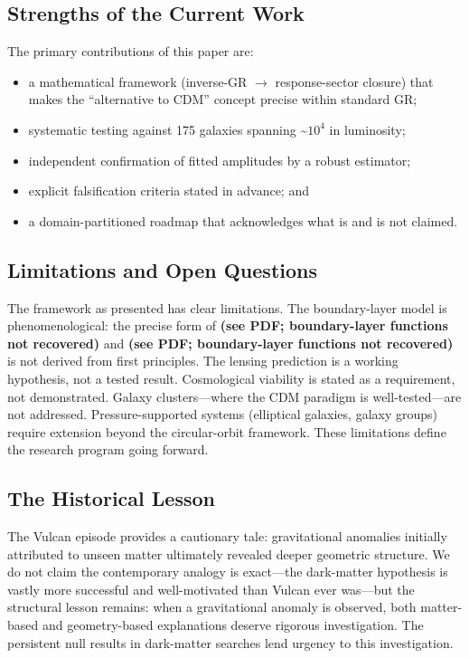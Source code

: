 \subsection{Strengths of the Current Work}

The primary contributions of this paper are:
\begin{itemize}
	\item a mathematical framework (inverse-GR $\to$ response-sector closure) that makes the ``alternative to CDM'' concept precise within standard GR;
	\item systematic testing against 175 galaxies spanning \textasciitilde{}$10^4$ in luminosity;
	\item independent confirmation of fitted amplitudes by a robust estimator;
	\item explicit falsification criteria stated in advance; and
	\item a domain-partitioned roadmap that acknowledges what is and is not claimed.
\end{itemize}

\subsection{Limitations and Open Questions}

The framework as presented has clear limitations. The boundary-layer model is phenomenological: the precise form of \textbf{(see PDF; boundary-layer functions not recovered)} and \textbf{(see PDF; boundary-layer functions not recovered)} is not derived from first principles. The lensing prediction is a working hypothesis, not a tested result. Cosmological viability is stated as a requirement, not demonstrated. Galaxy clusters---where the CDM paradigm is well-tested---are not addressed. Pressure-supported systems (elliptical galaxies, galaxy groups) require extension beyond the circular-orbit framework. These limitations define the research program going forward.

\subsection{The Historical Lesson}

The Vulcan episode provides a cautionary tale: gravitational anomalies initially attributed to unseen matter ultimately revealed deeper geometric structure. We do not claim the contemporary analogy is exact---the dark-matter hypothesis is vastly more successful and well-motivated than Vulcan ever was---but the structural lesson remains: when a gravitational anomaly is observed, both matter-based and geometry-based explanations deserve rigorous investigation. The persistent null results in dark-matter searches lend urgency to this investigation.

